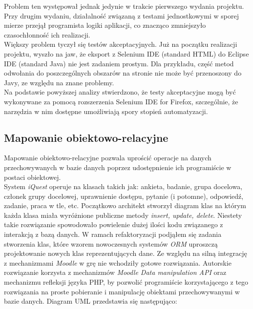 Problem ten występował jednak jedynie w trakcie pierwszego wydania projektu. Przy drugim wydaniu, działalność związaną z testami jednostkowymi w sporej mierze przejął programista logiki aplikacji, co znacząco zmniejszyło czasochłonność ich realizacji. \\

Większy problem tyczył się testów akceptacyjnych. Już na początku realizacji projektu, wyszło na jaw, że eksport z Selenium IDE (standard HTML) do Eclipse IDE (standard Java) nie jest zadaniem prostym. Dla przykładu, część metod odwołania do poszczególnych obszarów na stronie nie może być przenoszony do Javy, ze względu na znane problemy. \\

Na podstawie powyższej analizy stwierdzono, że testy akceptacyjne mogą być wykonywane za pomocą rozszerzenia Selenium IDE for Firefox, szczególnie, że narzędzia w nim dostępne umożliwiają spory stopień automatyzacji.

\subsection{Mapowanie obiektowo-relacyjne}
\label{Chapter62c}

Mapowanie obiektowo-relacyjne pozwala uprościć operacje na danych przechowywanych w bazie danych poprzez udostępnienie ich programiście w postaci obiektowej. \\

System \emph{iQuest} operuje na klasach takich jak: ankieta, badanie, grupa docelowa, członek grupy docelowej, uprawnienie dostępu, pytanie (i potomne), odpowiedź, zadanie, praca w tle, etc. Początkowo architekt stworzył diagram klas na którym każda klasa miała wyróżnione publiczne metody \emph{insert, update, delete}. Niestety takie rozwiązanie spowodowało powielenie dużej ilości kodu związanego z interakcją z bazą danych. W ramach refaktoryzacji podjąłem się zadania stworzenia klas, które wzorem nowoczesnych systemów \emph{ORM} uproszczą projektowanie nowych klas reprezentujących dane. Ze względu na silną integrację z mechanizmami \emph{Moodle} w grę nie wchodziły gotowe rozwiązania. Autorskie rozwiązanie korzysta z mechanizmów \emph{Moodle Data manipulation API} oraz mechanizmu refleksji języka PHP, by pozwolić programiście korzystającego z tego rozwiązania na proste pobieranie i manipulację obiektami przechowywanymi w bazie danych. Diagram UML przedstawia się następująco:

